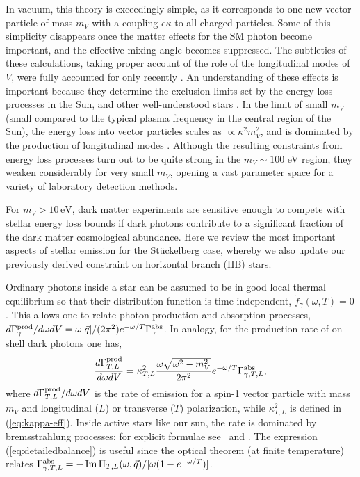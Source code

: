 \documentclass[prd,reprint,nofootinbib,notitlepage,aps,tightenlines,preprintnumbers,amsmath,amssymb,showpacs,superscriptaddress]{revtex4-1}
\newcommand{\eV}{\ensuremath{\mathrm{eV}}}
\DeclareMathOperator{\imag}{Im}
\begin{document}
In vacuum, this theory is exceedingly simple, as it corresponds to one
new vector particle of mass $m_V$ with a coupling $e\kappa$ to all
charged particles. Some of this simplicity disappears once the matter
effects for the SM photon become important, and the effective mixing
angle becomes suppressed. The subtleties of these calculations, taking  
proper account of the role of the longitudinal
modes of $V$, were fully accounted for only recently
\cite{An:2013yfc,An:2013yua,Redondo:2013lna,Graham:2014sha}. An understanding
of these effects is important because they determine the exclusion
limits set by the energy loss processes in the Sun, and other
well-understood stars \cite{Raffelt:1996wa}.  In the limit of small
$m_V$ (small compared to the typical plasma frequency in the central
region of the Sun), the energy loss into vector particles scales
as $\propto \kappa^2 m_V^2$, and is dominated by the production of
longitudinal modes \cite{An:2013yfc}. Although the resulting
constraints from energy loss processes turn out to be quite strong
in the $m_V \sim 100$ eV region, they weaken considerably for
very small $m_V$, opening a vast parameter space for a variety of
laboratory detection methods.


For $m_V > 10\,\eV$, dark matter experiments are sensitive enough to
compete with stellar energy loss bounds if dark photons contribute to a
significant fraction of the dark matter cosmological abundance. Here
we review the most important aspects of stellar emission for the
St\"uckelberg case, whereby we also update our previously derived
constraint on horizontal branch (HB) stars.

Ordinary photons inside a star can be assumed
to be in good local thermal equilibrium so that their distribution
function is time independent,
$\dot f_{\gamma}(\omega,T) = 0$.  This allows one to relate
photon production and absorption processes,
$d\Gamma_{\gamma}^{\rm prod}/d\omega dV = \omega |\vec q|/(2\pi^2)
e^{-\omega/T} \Gamma_{\gamma}^{\rm abs}$.
In analogy, for the production rate of on-shell dark photons one has,
%
\begin{align}
\label{eq:detailedbalance}
  \frac{d\Gamma^{\rm prod}_{T,L}}{d\omega dV}  = \kappa_{T,L}^2 
  \frac{\omega \sqrt{\omega^2 -m_V^2}}{2\pi^2} e^{-\omega/T} \Gamma^{\rm abs}_{\gamma, T,L},
\end{align}
%
where ${d\Gamma^{\rm prod}_{T,L}}/{d\omega dV}$ is the rate of
emission for a \mbox{spin-1} vector particle with mass $m_V$ and longitudinal
($L$) or transverse ($T$) polarization, while $\kappa_{T,L}^2 $ is defined in
(\ref{eq:kappa-eff}).  Inside active stars like our sun, the rate is
dominated by bremsstrahlung processes; for explicit
formulae see~\cite{An:2013yfc} and \cite{Redondo:2013lna}. The
expression (\ref{eq:detailedbalance}) is useful since the optical
theorem (at finite temperature) relates
$ \Gamma^{\rm abs}_{\gamma, T,L} = -\imag \Pi_{T,L}(\omega,\vec q)
/[\omega(1- e^{-\omega/T})]$.
\end{document}
